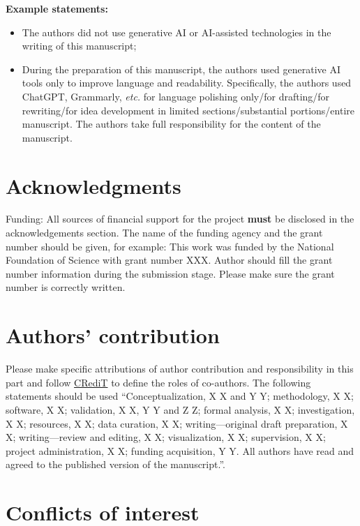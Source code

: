 \documentclass{ELSP}
\begin{document}
\vspace{+12pt}
\noindent\textbf{{Example statements:}}
\vspace{+12pt}
\begin{itemize}
\item The authors did not use generative AI or AI-assisted technologies in the writing of this manuscript;
\item During the preparation of this manuscript, the authors used generative AI tools only to improve language and readability. Specifically, the authors used ChatGPT, Grammarly, \textit{etc.} for language polishing only/for drafting/for rewriting/for idea development in limited sections/substantial portions/entire manuscript. The authors take full responsibility for the content of the manuscript. 
\end{itemize}

\section*{Acknowledgments}
 
Funding: All sources of financial support for the project \textbf{must}
be disclosed in the acknowledgements section. The name of the funding
agency and the grant number should be given, for example: This work was
funded by the National Foundation of Science with grant number
XXX. Author should fill the grant number information during the
submission stage. Please make sure the grant number is correctly
written. 

\section*{Authors’ contribution}

Please make specific attributions of author
contribution and responsibility in this part and follow
\href{https://casrai.org/credit/}{CRediT} to define the roles of
co-authors. The following statements should be used “Conceptualization, X X and Y Y; methodology, X X; software, X X; validation, X X, Y Y and Z Z; formal analysis, X X; investigation, X X; resources, X X; data curation, X X; writing—original draft preparation, X X; writing—review and editing, X X; visualization, X X; supervision, X X; project administration, X X; funding acquisition, Y Y. All authors have read and agreed to the published version of the manuscript.”.

\section*{Conflicts of interest}
\end{document}
